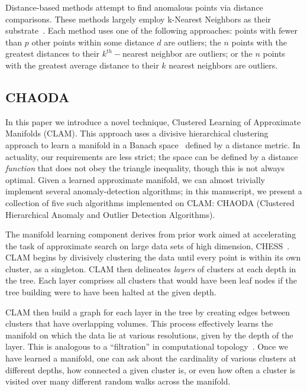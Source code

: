 Distance-based methods attempt to find anomalous points via distance comparisons.
These methods largely employ k-Nearest Neighbors as their substrate~\cite{wang2019progress}.
Each method uses one of the following approaches: points with fewer than $p$ other points within some distance $d$ are outliers; the $n$ points with the greatest distances to their $k^{th}-$nearest neighbor are outliers; or the $n$ points with the greatest average distance to their $k$ nearest neighbors are outliers.

\subsection{CHAODA}\label{introduction:chaoda}

In this paper we introduce a novel technique, Clustered Learning of Approximate Manifolds (CLAM).
This approach uses a divisive hierarchical clustering approach to learn a manifold in a Banach space~\cite{banach1929fonctionnelles} defined by a distance metric.
In actuality, our requirements are less strict; the space can be defined by a distance \textit{function} that does not obey the triangle inequality, though this is not always optimal. 
Given a learned approximate manifold, we can almost trivially implement several anomaly-detection algorithms; in this manuscript, we present a collection of five such algorithms implemented on CLAM: CHAODA (Clustered Hierarchical Anomaly and Outlier Detection Algorithms).

The manifold learning component derives from prior work aimed at accelerating the task of approximate search on large data sets of high dimension, CHESS~\cite{ishaq2019entropy}.
CLAM begins by divisively clustering the data until every point is within its own cluster, as a singleton.
CLAM then delineates \textit{layers} of clusters at each depth in the tree.
Each layer comprises all clusters that would have been leaf nodes if the tree building were to have been halted at the given depth.

CLAM then build a graph for each layer in the tree by creating edges between clusters that have overlapping volumes.
This process effectively learns the manifold on which the data lie at various resolutions, given by the depth of the layer.
This is analogous to a ``filtration'' in computational topology~\cite{carlsson2009topology}.
Once we have learned a manifold, one can ask about the cardinality of various clusters at different depths, how connected a given cluster is, or even how often a cluster is visited over many different random walks across the manifold.

